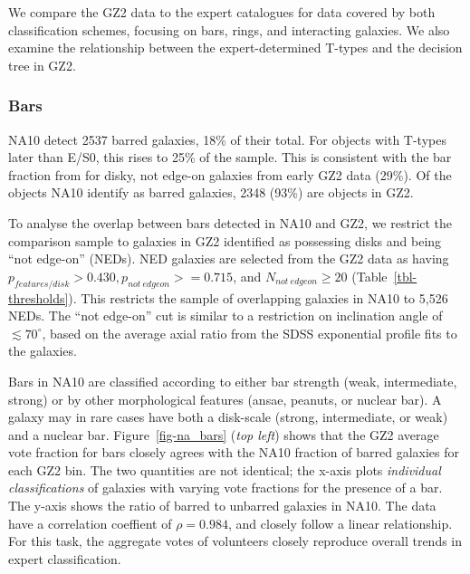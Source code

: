 \documentclass[useAMS,usenatbib]{mn2e}
\begin{document}
We compare the GZ2 data to the expert catalogues for data covered by both classification schemes, focusing on bars, rings, and interacting galaxies. We also examine the relationship between the expert-determined T-types and the decision tree in GZ2.

\subsubsection{Bars}

NA10 detect 2537 barred galaxies, 18\% of their total. For objects with T-types later than E/S0, this rises to 25\% of the sample. This is consistent with the bar fraction from \citep{mas11c} for disky, not edge-on galaxies from early GZ2 data (29\%). Of the objects NA10 identify as barred galaxies, 2348 (93\%) are objects in GZ2. 

To analyse the overlap between bars detected in NA10 and GZ2, we restrict the comparison sample to galaxies in GZ2 identified as possessing disks and being ``not edge-on'' (NEDs). NED galaxies are selected from the GZ2 data as having $p_{features/disk}>0.430, p_{not~edgeon}>=0.715$, and $N_{not~edgeon}\geq20$ (Table~\ref{tbl-thresholds}). This restricts the sample of overlapping galaxies in NA10 to 5,526 NEDs. The ``not edge-on'' cut is similar to a restriction on inclination angle of $\lesssim70^\circ$, based on the average axial ratio from the SDSS exponential profile fits to the galaxies.

Bars in NA10 are classified according to either bar strength (weak, intermediate, strong) or by other morphological features (ansae, peanuts, or nuclear bar). A galaxy may in rare cases have both a disk-scale (strong, intermediate, or weak) and a nuclear bar. Figure~\ref{fig-na_bars} ({\it top left}) shows that the GZ2 average vote fraction for bars closely agrees with the NA10 fraction of barred galaxies for each GZ2 bin. The two quantities are not identical; the x-axis plots {\it individual classifications} of galaxies with varying vote fractions for the presence of a bar. The y-axis shows the ratio of barred to unbarred galaxies in NA10. The data have a correlation coeffient of $\rho=0.984$, and closely follow a linear relationship. For this task, the aggregate votes of volunteers closely reproduce overall trends in expert classification. 
\end{document}
